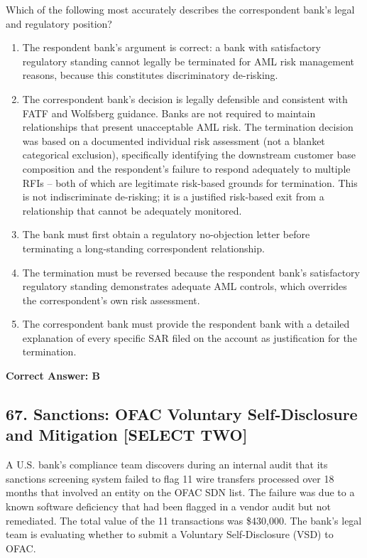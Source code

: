 \documentclass[11pt,a4paper]{article}
\begin{document}
	Which of the following most accurately describes the correspondent bank's legal and regulatory position?
	
	\begin{enumerate}[label=\Alph*.]
		\item The respondent bank's argument is correct: a bank with satisfactory regulatory standing cannot legally be terminated for AML risk management reasons, because this constitutes discriminatory de-risking.
		\item The correspondent bank's decision is legally defensible and consistent with FATF and Wolfsberg guidance. Banks are not required to maintain relationships that present unacceptable AML risk. The termination decision was based on a documented individual risk assessment (not a blanket categorical exclusion), specifically identifying the downstream customer base composition and the respondent's failure to respond adequately to multiple RFIs -- both of which are legitimate risk-based grounds for termination. This is not indiscriminate de-risking; it is a justified risk-based exit from a relationship that cannot be adequately monitored.
		\item The bank must first obtain a regulatory no-objection letter before terminating a long-standing correspondent relationship.
		\item The termination must be reversed because the respondent bank's satisfactory regulatory standing demonstrates adequate AML controls, which overrides the correspondent's own risk assessment.
		\item The correspondent bank must provide the respondent bank with a detailed explanation of every specific SAR filed on the account as justification for the termination.
	\end{enumerate}
	\textbf{Correct Answer: B}
	
	\subsection{67. Sanctions: OFAC Voluntary Self-Disclosure and Mitigation \textnormal{[SELECT TWO]}}
	
	A U.S. bank's compliance team discovers during an internal audit that its sanctions screening system failed to flag 11 wire transfers processed over 18 months that involved an entity on the OFAC SDN list. The failure was due to a known software deficiency that had been flagged in a vendor audit but not remediated. The total value of the 11 transactions was \$430,000. The bank's legal team is evaluating whether to submit a Voluntary Self-Disclosure (VSD) to OFAC.
	
\end{document}
